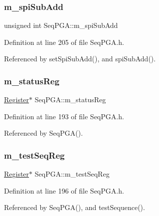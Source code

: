 \subsubsection{\texorpdfstring{m\+\_\+spi\+Sub\+Add}{m\_spiSubAdd}}
{\footnotesize\ttfamily unsigned int Seq\+P\+G\+A\+::m\+\_\+spi\+Sub\+Add\hspace{0.3cm}{\ttfamily [private]}}



Definition at line 205 of file Seq\+P\+G\+A.\+h.



Referenced by set\+Spi\+Sub\+Add(), and spi\+Sub\+Add().

\mbox{\label{classSeqPGA_ae39eb15fbde7a4a48376c8cbdbbceeaa}} 
\subsubsection{\texorpdfstring{m\+\_\+status\+Reg}{m\_statusReg}}
{\footnotesize\ttfamily \hyperlink{classRegister}{Register}$\ast$ Seq\+P\+G\+A\+::m\+\_\+status\+Reg\hspace{0.3cm}{\ttfamily [private]}}



Definition at line 193 of file Seq\+P\+G\+A.\+h.



Referenced by Seq\+P\+G\+A().

\mbox{\label{classSeqPGA_a7478537516c951a4d08f23b0789ed6d9}} 
\subsubsection{\texorpdfstring{m\+\_\+test\+Seq\+Reg}{m\_testSeqReg}}
{\footnotesize\ttfamily \hyperlink{classRegister}{Register}$\ast$ Seq\+P\+G\+A\+::m\+\_\+test\+Seq\+Reg\hspace{0.3cm}{\ttfamily [private]}}



Definition at line 196 of file Seq\+P\+G\+A.\+h.



Referenced by Seq\+P\+G\+A(), and test\+Sequence().

